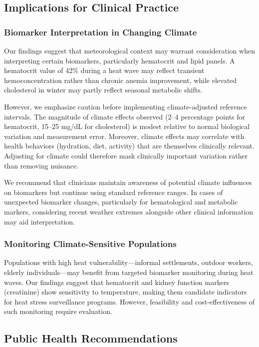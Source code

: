 \subsection{Implications for Clinical Practice}

\subsubsection{Biomarker Interpretation in Changing Climate}

Our findings suggest that meteorological context may warrant consideration when interpreting certain biomarkers, particularly hematocrit and lipid panels. A hematocrit value of 42\% during a heat wave may reflect transient hemoconcentration rather than chronic anemia improvement, while elevated cholesterol in winter may partly reflect seasonal metabolic shifts.

However, we emphasize caution before implementing climate-adjusted reference intervals. The magnitude of climate effects observed (2--4 percentage points for hematocrit, 15--25 mg/dL for cholesterol) is modest relative to normal biological variation and measurement error. Moreover, climate effects may correlate with health behaviors (hydration, diet, activity) that are themselves clinically relevant. Adjusting for climate could therefore mask clinically important variation rather than removing nuisance.

We recommend that clinicians maintain awareness of potential climate influences on biomarkers but continue using standard reference ranges. In cases of unexpected biomarker changes, particularly for hematological and metabolic markers, considering recent weather extremes alongside other clinical information may aid interpretation.

\subsubsection{Monitoring Climate-Sensitive Populations}

Populations with high heat vulnerability---informal settlements, outdoor workers, elderly individuals---may benefit from targeted biomarker monitoring during heat waves. Our findings suggest that hematocrit and kidney function markers (creatinine) show sensitivity to temperature, making them candidate indicators for heat stress surveillance programs. However, feasibility and cost-effectiveness of such monitoring require evaluation.

\subsection{Public Health Recommendations}

